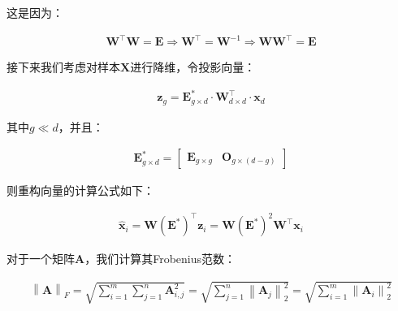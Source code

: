 \documentclass[UTF8]{book}
\begin{document}
这是因为：
\begin{large}
    \begin{equation}
        \begin{aligned}
            \mathbf{W}^\top\mathbf{W}=\mathbf{E} \Rightarrow \mathbf{W}^\top=\mathbf{W}^{-1} \Rightarrow \mathbf{W}\mathbf{W}^\top=\mathbf{E}
            \nonumber
        \end{aligned}
    \end{equation}
\end{large}
接下来我们考虑对样本$\mathbf{X}$进行降维，令投影向量：
\begin{large}
    \begin{equation}
        \begin{aligned}
            \mathbf{z}_{g}=\mathbf{E}_{g \times d}^* \cdot \mathbf{W}_{d\times d}^\top \cdot \mathbf{x}_{d}
            \nonumber
        \end{aligned}
    \end{equation}
\end{large}
其中$g \ll d$，并且：
\begin{large}
    \begin{equation}
        \begin{aligned}
            \mathbf{E}_{g\times d}^*=\begin{bmatrix}
            \mathbf{E}_{g\times g} & \mathbf{O}_{g\times (d-g)}
            \end{bmatrix}
            \nonumber
        \end{aligned}
    \end{equation}
\end{large}
则重构向量的计算公式如下：
\begin{large}
    \begin{equation}
        \begin{aligned}
            \hat{\mathbf{x}}_i=\mathbf{W} \left(\mathbf{E}^*\right)^\top \mathbf{z}_i = \mathbf{W}(\mathbf{E}^*)^2\mathbf{W}^\top \mathbf{x}_i
            \nonumber
        \end{aligned}
    \end{equation}
\end{large}
对于一个矩阵$\mathbf{A}$，我们计算其Frobenius范数：
\begin{large}
    \begin{equation}
        \begin{aligned}
            \left\| \mathbf{A} \right\|_F=\sqrt{\sum_{i=1}^{m}\sum_{j=1}^{n}\mathbf{A}_{i,j}^2}=\sqrt{\sum_{j=1}^{n} \left\| \mathbf{A}_j \right\|_2^2 }=\sqrt{\sum_{i=1}^{m} \left\| \mathbf{A}_i \right\|_2^2 }
            \nonumber
        \end{aligned}
    \end{equation}
\end{large}
\end{document}

